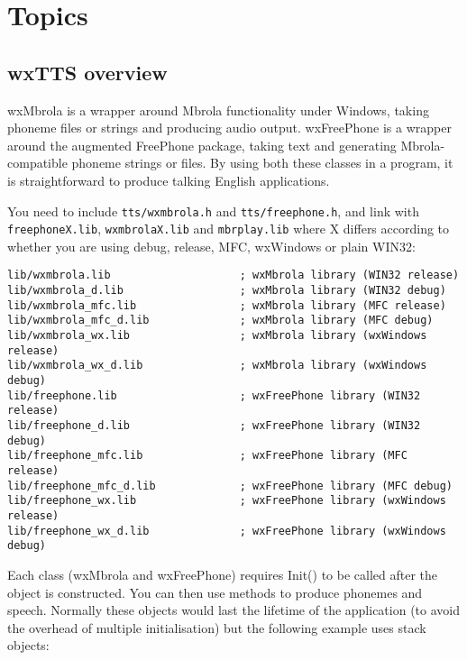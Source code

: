 \chapter{Topics}\label{topics}
%
\setfooter{\thepage}{}{}{}{}{\thepage}%

\section{wxTTS overview}\label{ttsoverview}

wxMbrola is a wrapper around Mbrola functionality under Windows, taking
phoneme files or strings and producing audio output. wxFreePhone is a wrapper
around the augmented FreePhone package, taking text and generating Mbrola-compatible
phoneme strings or files. By using both these classes in a program, it is straightforward
to produce talking English applications.


You need to include {\tt tts/wxmbrola.h} and {\tt tts/freephone.h}, and link with
 {\tt freephoneX.lib}, {\tt wxmbrolaX.lib} and {\tt mbrplay.lib} where X differs
according to whether you are using debug, release, MFC, wxWindows or plain WIN32:

{\small\begin{verbatim}
lib/wxmbrola.lib                    ; wxMbrola library (WIN32 release)
lib/wxmbrola_d.lib                  ; wxMbrola library (WIN32 debug)
lib/wxmbrola_mfc.lib                ; wxMbrola library (MFC release)
lib/wxmbrola_mfc_d.lib              ; wxMbrola library (MFC debug)
lib/wxmbrola_wx.lib                 ; wxMbrola library (wxWindows release)
lib/wxmbrola_wx_d.lib               ; wxMbrola library (wxWindows debug)
lib/freephone.lib                   ; wxFreePhone library (WIN32 release)
lib/freephone_d.lib                 ; wxFreePhone library (WIN32 debug)
lib/freephone_mfc.lib               ; wxFreePhone library (MFC release)
lib/freephone_mfc_d.lib             ; wxFreePhone library (MFC debug)
lib/freephone_wx.lib                ; wxFreePhone library (wxWindows release)
lib/freephone_wx_d.lib              ; wxFreePhone library (wxWindows debug)
\end{verbatim}
}

Each class (wxMbrola and wxFreePhone) requires Init() to be called after the object
is constructed. You can then use methods to produce phonemes and speech. Normally
these objects would last the lifetime of the application (to avoid the overhead of
multiple initialisation) but the following example uses stack objects:

